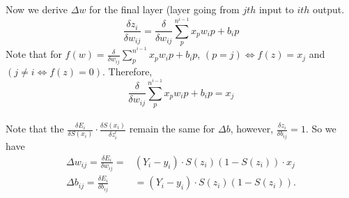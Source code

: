 \documentclass[11pt,letterpaper]{amsbook}
\theoremstyle{definition}
\numberwithin{definition}{chapter}
\numberwithin{exercise}{chapter}
\numberwithin{section}{chapter}
\newcommand{\ds}{\displaystyle}
\begin{document}
\vspace{2em}
Now we derive $\Delta w$ for the final layer (layer going from $jth$ input to $ith$ output.
\begin{equation}
    \frac{\delta z_i}{\delta w_{ij}} = \frac{\delta}{\delta w_{ij}} \sum^{n^{i - 1}}_p x_p w_ip + b_ip 
\end{equation}
Note that for $f(w) = \ds \frac{\delta}{\delta w_{ij}} \sum^{n^{i - 1}}_p x_p w_ip + b_ip $, $(p = j) \iff f(z) = x_j  $ and $(j \neq i \iff f(z) = 0)$. Therefore, \begin{equation}
    \frac{\delta}{\delta w_{ij}} \sum^{n^{i - 1}}_p x_p w_ip + b_ip = x_j
\end{equation}
\\
Note that the $\ds \frac{\delta E_i}{\delta S(x_i)} \cdot \frac{\delta S(x_i)}{\delta z^l_i}$ remain the same for $\Delta b$, however, $\ds \frac{\delta z_i}{\delta b_{ij}} = 1$.
So we have \begin{align}
    \Delta w_{ij} = \frac{\delta E_i}{\delta w_{ij}} =& (Y_i - y_i) \cdot S(z_i)(1 - S(z_i)) \cdot x_j \\
    \Delta b_{ij} = \frac{\delta E_i}{\delta b_{ij}} &= (Y_i - y_i) \cdot S(z_i)(1 - S(z_i)).
\end{align}
\vspace{2em}
\end{document}
